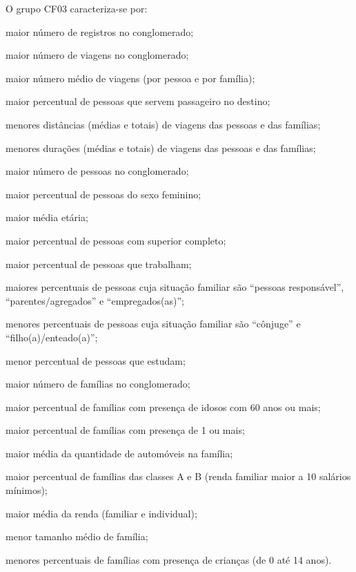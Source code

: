 O grupo CF03 caracteriza-se por:
\begin{compactitem}
\item maior número de registros no conglomerado;
\item maior número de viagens no conglomerado;
\item maior número médio de viagens (por pessoa e por família);
\item maior percentual de pessoas que servem passageiro no destino;
\item menores distâncias (médias e totais) de viagens das pessoas e das famílias;
\item menores durações (médias e totais) de viagens das pessoas e das famílias;

\item maior número de pessoas no conglomerado;
\item maior percentual de pessoas do sexo feminino;
\item maior média etária;
\item maior percentual de pessoas com superior completo;
\item maior percentual de pessoas que trabalham;
\item maiores percentuais de pessoas cuja situação familiar são ``pessoas responsável'', ``parentes/agregados'' e ``empregados(as)'';
\item menores percentuais de pessoas cuja situação familiar são ``cônjuge'' e ``filho(a)/enteado(a)'';
\item menor percentual de pessoas que estudam;

\item maior número de famílias no conglomerado;
\item maior percentual de famílias com presença de idosos com 60 anos ou mais;
\item maior percentual de famílias com presença de 1 ou mais;
\item maior média da quantidade de automóveis na família;
\item maior percentual de famílias das classes A e B (renda familiar maior a 10 salários mínimos);
\item maior média da renda (familiar e individual);
\item menor tamanho médio de família;
\item menores percentuais de famílias com presença de crianças (de 0 até 14 anos).
\end{compactitem}

